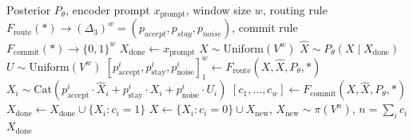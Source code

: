 \begin{algorithm}[tb]
\caption{Generic Diffusion Sampler}
\label{alg:gen-adapt}
\begin{algorithmic}[1]
\Require Posterior $P_\theta$, encoder prompt $x_{\mathrm{prompt}}$, window size $w$, routing rule $F_{\mathrm{route}}(*) \to (\Delta_{3})^w = (p_{accept}, p_{stay}, p_{noise})$, commit rule $F_{\mathrm{commit}}(*) \to \{0, 1\}^w$
\State $X_{\mathrm{done}} \gets x_{\mathrm{prompt}}$
\State $X \sim \text{Uniform}(V^w)$
    \State $\hat{X} \sim P_{\theta}(X \mid X_{\mathrm{done}})$
    \State $U \sim \text{Uniform}(V^w)$
    \State $[p_{\mathrm{accept}}^i, p_{\mathrm{stay}}^i, p_{\mathrm{noise}}^i]_1^w \gets F_{\mathrm{route}}(X, \hat{X}, P_{\theta}, *)$
    \State $X_i \sim \text{Cat} \left( p_{\mathrm{accept}}^i \cdot \hat{X}_i + p_{\mathrm{stay}}^i \cdot X_i + p_{\mathrm{noise}}^i \cdot U_i \right)$
    \State $[c_1, \dots, c_w] \gets F_{\mathrm{commit}}(X, \hat{X}, P_{\theta}, *)$ 
    \State $X_{\mathrm{done}} \gets X_{\mathrm{done}} \cup \{X_{i} : c_i = 1\}$ 
    \State $X \gets \{X_{i}: c_i = 0 \} \cup X_{\mathrm{new}}$, $X_{\mathrm{new}} \sim \pi(V^{n})$, $n = \sum_i c_i$ 
\EndWhile
\State \Return $X_{\mathrm{done}}$
\end{algorithmic}
\end{algorithm}